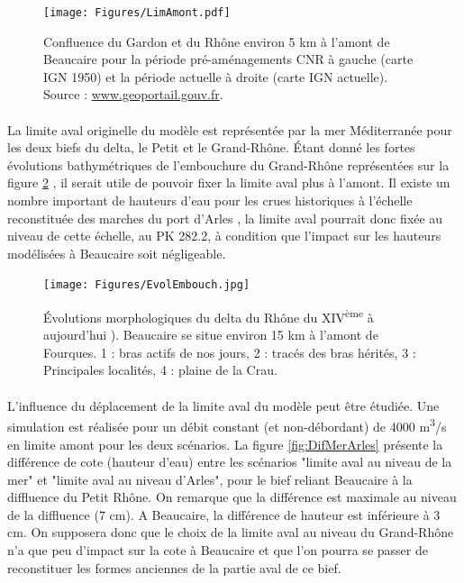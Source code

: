 \documentclass[11pt]{article}
\begin{document}
	 \begin{figure}[h]
		\centering
	    \texttt{[image: Figures/LimAmont.pdf]}
        \caption{Confluence du Gardon et du Rhône environ 5 km à l'amont de Beaucaire pour la période pré-aménagements CNR à gauche (carte IGN 1950) et la période actuelle à droite (carte IGN actuelle). Source : \url{www.geoportail.gouv.fr}.}
		\label{fig:LimAmont}
	\end{figure}
	 
	\paragraph{} La limite aval originelle du modèle est représentée par la mer Méditerranée pour les deux biefs du delta, le Petit et le Grand-Rhône. Étant donné les fortes évolutions bathymétriques de l'embouchure du Grand-Rhône représentées sur la figure \ref{fig:Embouch} \citep{pichard_les_2014}, il serait utile de pouvoir fixer la limite aval plus à l'amont. Il existe un nombre important de hauteurs d'eau pour les crues historiques à l'échelle reconstituée des marches du port d'Arles \citep{pichard_les_1995}, la limite aval pourrait donc fixée au niveau de cette échelle, au PK 282.2, à condition que l'impact sur les hauteurs modélisées à Beaucaire soit négligeable.
	
	\begin{figure}[h]
		\centering
	    \texttt{[image: Figures/EvolEmbouch.jpg]}
        \caption{Évolutions morphologiques du delta du Rhône du XIV\textsuperscript{ème} à aujourd'hui \citep{pichard_les_2014}). Beaucaire se situe environ 15 km à l'amont de Fourques. 1 : bras actifs de nos jours, 2 : tracés des bras hérités, 3 : Principales localités, 4 : plaine de la Crau.}
		\label{fig:Embouch}
	\end{figure}

	\paragraph{} L'influence du déplacement de la limite aval du modèle peut être étudiée. Une simulation est réalisée pour un débit constant (et non-débordant) de 4000 m\textsuperscript{3}/s en limite amont pour les deux scénarios. La figure \ref{fig:DifMerArles} présente la différence de cote (hauteur d'eau) entre les scénarios "limite aval au niveau de la mer" et "limite aval au niveau d'Arles", pour le bief reliant Beaucaire à la diffluence du Petit Rhône. On remarque que la différence est maximale au niveau de la diffluence (7 cm). A Beaucaire, la différence de hauteur est inférieure à 3 cm. On supposera donc que le choix de la limite aval au niveau du Grand-Rhône n'a que peu d'impact sur la cote à Beaucaire et que l'on pourra se passer de reconstituer les formes anciennes de la partie aval de ce bief. 
	 
\end{document}

